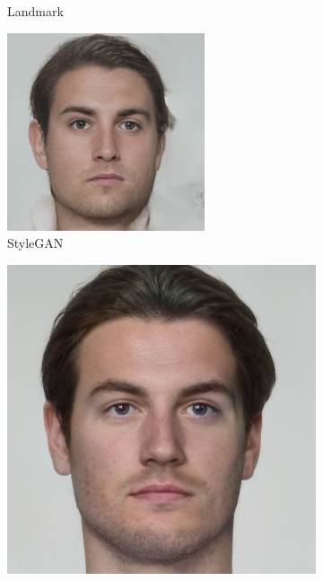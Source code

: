 \documentclass[12pt,twocolumn]{paper}
\begin{document}
\begin{figure}[t]
\begin{subfigure}{0.19\textwidth}
        \caption{Landmark}
        \label{morph_comp_2}
    \end{subfigure}
    \begin{subfigure}{0.19\textwidth}
        \centering
        \includegraphics[width=\textwidth]{sgan1_morph.png}
        \caption{StyleGAN}
        \label{morph_comp_3}
    \end{subfigure}
    \begin{subfigure}{0.19\textwidth}
        \centering
        \includegraphics[width=\textwidth]{sgan2_morph.png}

\end{subfigure}
\end{figure}
\end{document}
